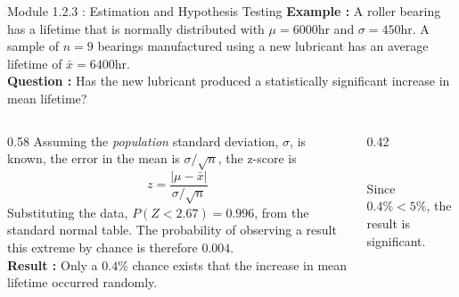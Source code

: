 \documentclass{beamer}
\begin{document}
\begin{frame}{Module 1.2.3 : Estimation and Hypothesis Testing}
\scriptsize
\textbf{Example :} A roller bearing has a lifetime that is normally distributed with $\mu = 6000\text{hr}$ and $\sigma = 450\text{hr}$.  A sample of $n=9$ bearings manufactured using a new lubricant has an average lifetime of $\bar{x}=6400\text{hr}$. \\ \vspace{0.25cm}
\textbf{Question :} Has the new lubricant produced a statistically significant increase in mean lifetime?
\vspace{0.25cm}
\begin{columns}[T]
\begin{column}{0.58\textwidth}
\scriptsize
Assuming the \textit{population} standard deviation, $\sigma$, is known, the error in the mean is $\sigma/\sqrt{n}$, the z-score is 
\begin{equation}
z=\frac{\left|\mu-\bar{x}\right|}{\sigma/\sqrt{n}}
\end{equation}
Substituting the data, $P(Z<2.67)=0.996$, from the standard normal table. The probability of observing a result this
extreme by chance is therefore $0.004$. \\ \vspace{0.25cm}
\textbf{Result :} Only a $0.4\%$ chance exists that the increase in mean lifetime occurred randomly.
\end{column}
\begin{column}{0.42\textwidth}
 \\
\scriptsize
Since $0.4\% < 5\%$, the result is significant.
\end{column}
\end{columns}
\end{frame}
\end{document}
